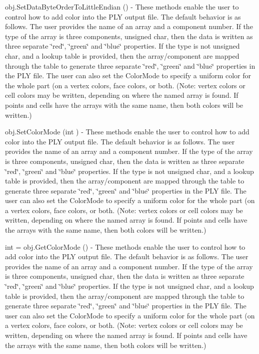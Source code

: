 \begin{DoxyItemize}
\item {\ttfamily obj.\-Set\-Data\-Byte\-Order\-To\-Little\-Endian ()} -\/ These methods enable the user to control how to add color into the P\-L\-Y output file. The default behavior is as follows. The user provides the name of an array and a component number. If the type of the array is three components, unsigned char, then the data is written as three separate \char`\"{}red\char`\"{}, \char`\"{}green\char`\"{} and \char`\"{}blue\char`\"{} properties. If the type is not unsigned char, and a lookup table is provided, then the array/component are mapped through the table to generate three separate \char`\"{}red\char`\"{}, \char`\"{}green\char`\"{} and \char`\"{}blue\char`\"{} properties in the P\-L\-Y file. The user can also set the Color\-Mode to specify a uniform color for the whole part (on a vertex colors, face colors, or both. (Note\-: vertex colors or cell colors may be written, depending on where the named array is found. If points and cells have the arrays with the same name, then both colors will be written.)  
\item {\ttfamily obj.\-Set\-Color\-Mode (int )} -\/ These methods enable the user to control how to add color into the P\-L\-Y output file. The default behavior is as follows. The user provides the name of an array and a component number. If the type of the array is three components, unsigned char, then the data is written as three separate \char`\"{}red\char`\"{}, \char`\"{}green\char`\"{} and \char`\"{}blue\char`\"{} properties. If the type is not unsigned char, and a lookup table is provided, then the array/component are mapped through the table to generate three separate \char`\"{}red\char`\"{}, \char`\"{}green\char`\"{} and \char`\"{}blue\char`\"{} properties in the P\-L\-Y file. The user can also set the Color\-Mode to specify a uniform color for the whole part (on a vertex colors, face colors, or both. (Note\-: vertex colors or cell colors may be written, depending on where the named array is found. If points and cells have the arrays with the same name, then both colors will be written.)  
\item {\ttfamily int = obj.\-Get\-Color\-Mode ()} -\/ These methods enable the user to control how to add color into the P\-L\-Y output file. The default behavior is as follows. The user provides the name of an array and a component number. If the type of the array is three components, unsigned char, then the data is written as three separate \char`\"{}red\char`\"{}, \char`\"{}green\char`\"{} and \char`\"{}blue\char`\"{} properties. If the type is not unsigned char, and a lookup table is provided, then the array/component are mapped through the table to generate three separate \char`\"{}red\char`\"{}, \char`\"{}green\char`\"{} and \char`\"{}blue\char`\"{} properties in the P\-L\-Y file. The user can also set the Color\-Mode to specify a uniform color for the whole part (on a vertex colors, face colors, or both. (Note\-: vertex colors or cell colors may be written, depending on where the named array is found. If points and cells have the arrays with the same name, then both colors will be written.)  

\end{DoxyItemize}
